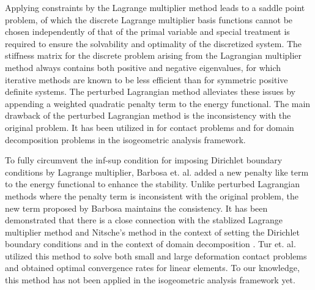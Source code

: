 Applying constraints by the Lagrange multiplier method leads to a saddle point problem, of which the discrete Lagrange multiplier basis functions cannot be chosen independently of that of the primal variable and special treatment is required to ensure the solvability and optimality of the discretized system. The stiffness matrix for the discrete problem arising from the Lagrangian multiplier method always contains both positive and negative eigenvalues, for which iterative methods are known to be less efficient than for symmetric positive definite systems. The perturbed Lagrangian method alleviates these issues by appending a weighted quadratic penalty term to the energy functional. The main drawback of the perturbed Lagrangian method is the inconsistency with the original problem. It has been utilized in \cite{simo1985perturbed} for contact problems and \cite{dornisch2011boundary, apostolatos2015domain} for domain decomposition problems in the isogeometric analysis framework.\par

To fully circumvent the inf-sup condition for imposing Dirichlet boundary conditions by Lagrange multiplier, Barbosa et. al. \cite{barbosa1991finite} added a new penalty like term to the energy functional to enhance the stability. Unlike perturbed Lagrangian methods where the penalty term is inconsistent with the original problem, the new term proposed by Barbosa maintains the consistency. It has been demonstrated that there is a close connection with the stablized Lagrange multiplier method and Nitsche's method in the context of setting the Dirichlet boundary conditions \cite{stenberg1995some} and in the context of domain decomposition \cite{hansbo2005lagrange, hansbo_nitsches_2005, juntunen2015connection}. Tur et. al. \cite{tur2015modified} utilized this method to solve both small and large deformation contact problems and obtained optimal convergence rates for linear elements. To our knowledge, this method has not been applied in the isogeometric analysis framework yet. \par

